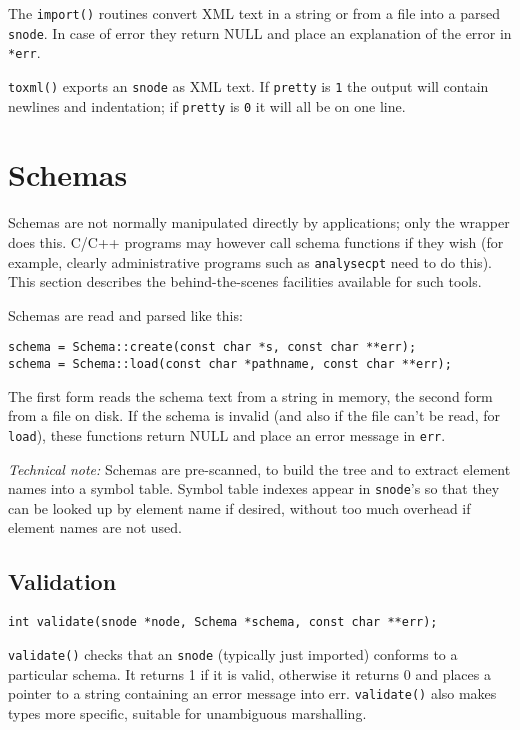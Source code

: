 \documentclass[12pt,a4paper,twoside]{article}
\renewcommand{\_}{\texttt{\symbol{95}}}
\begin{document}
The \verb^import()^ routines convert XML text in a string or from a file
into a parsed \verb^snode^. In case of error they return NULL
and place an explanation of the error in \verb^*err^.

\verb^toxml()^ exports an \verb^snode^ as XML text. If \verb^pretty^ is
\verb^1^ the output will contain newlines and indentation; if
\verb^pretty^ is \verb^0^ it will all be on one line.

\section{Schemas}
\label{schemas}

Schemas are not normally manipulated directly by applications; only
the wrapper does this. C/C++ programs may however call schema functions
if they wish (for example, clearly administrative programs such
as \verb^analysecpt^ need to do this). This section describes the
behind-the-scenes facilities available for such tools.

Schemas are read and parsed like this:

\begin{verbatim}
schema = Schema::create(const char *s, const char **err);
schema = Schema::load(const char *pathname, const char **err);
\end{verbatim}

The first form reads the schema text from a string in memory, the
second form from a file on disk. If the schema is invalid (and also
if the file can't be read, for \verb^load^), these functions return
NULL and place an error message in \verb^err^.

\textit{Technical note:} Schemas are pre-scanned, to build the tree and to extract
element names into a symbol table. Symbol table indexes appear in
\verb^snode^'s so that they can be looked up by element name if desired,
without too much overhead if element names are not used.

\subsection{Validation}

\begin{verbatim}
int validate(snode *node, Schema *schema, const char **err);
\end{verbatim}

\verb^validate()^ checks that an \verb^snode^ (typically just imported)
conforms to a particular schema. It returns 1 if it is valid,
otherwise it returns 0 and places a pointer to a string containing an
error message into err. \verb^validate()^ also makes types more specific,
suitable for unambiguous marshalling.
\end{document}
